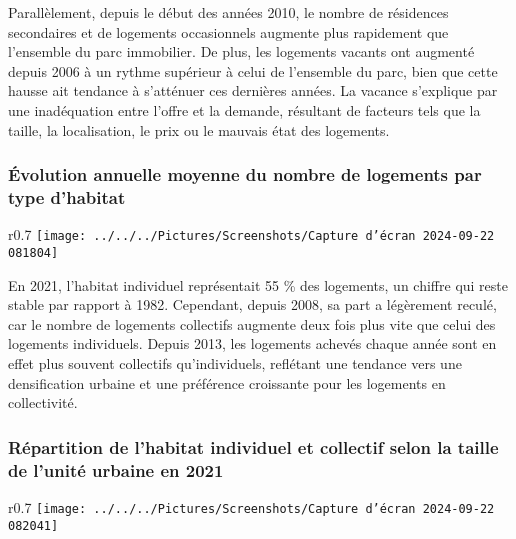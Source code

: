 \documentclass[a4paper, 12pt]{report}
\begin{document}
Parallèlement, depuis le début des années 2010, le nombre de résidences secondaires et de logements occasionnels augmente plus rapidement que l’ensemble du parc immobilier. De plus, les logements vacants ont augmenté depuis 2006 à un rythme supérieur à celui de l’ensemble du parc, bien que cette hausse ait tendance à s’atténuer ces dernières années. La vacance s’explique par une inadéquation entre l’offre et la demande, résultant de facteurs tels que la taille, la localisation, le prix ou le mauvais état des logements.

\subsubsection{Évolution annuelle moyenne du nombre de logements par type d'habitat}

\begin{wrapfigure}{r}{0.7\textwidth}
	\centering
\texttt{[image: ../../../Pictures/Screenshots/Capture d'écran 2024-09-22 081804]}
\end{wrapfigure}

En 2021, l’habitat individuel représentait 55 \% des logements, un chiffre qui reste stable par rapport à 1982. Cependant, depuis 2008, sa part a légèrement reculé, car le nombre de logements collectifs augmente deux fois plus vite que celui des logements individuels. Depuis 2013, les logements achevés chaque année sont en effet plus souvent collectifs qu’individuels, reflétant une tendance vers une densification urbaine et une préférence croissante pour les logements en collectivité.

\subsubsection{Répartition de l'habitat individuel et collectif selon la taille de l’unité urbaine en 2021}

\begin{wrapfigure}{r}{0.7\textwidth}
	\centering
\texttt{[image: ../../../Pictures/Screenshots/Capture d'écran 2024-09-22 082041]}
\end{wrapfigure}
\end{document}

